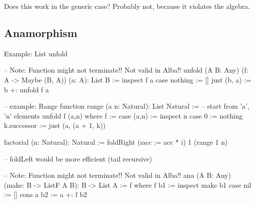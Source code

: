 Does this work in the generic case? Probably not, because it violates the
algebra.





\subsection{Anamorphism}

Example: List unfold

\begin{alba}
    -- Note: Function might not terminate!! Not valid in Alba!!
    unfold (A B: Any) (f: A -> Maybe (B, A)) (a: A): List B :=
        inspect f a case
            nothing :=
                []
            just (b, a) :=
                b +: unfold f a

    -- example: Range function
    range (a n: Natural): List Natural :=
            -- start from 'a', 'n' elements
        unfold f (a,n)
        where
            f :=
                case
                    (a,n) :=
                        inspect n case
                            0 :=
                                nothing
                            k.successor :=
                                just (a, (a + 1, k))
\end{alba}





\begin{alba}
    factorial (n: Natural): Natural :=
        foldRight (\i acc := acc * i) 1 (range 1 n)

        -- foldLeft would be more efficient (tail recursive)
\end{alba}


\begin{alba}
    -- Note: Function might not terminate!! Not valid in Alba!!
    ana (A B: Any) (make: B -> ListF A B): B -> List A :=
        f where
            f b1 :=
                inspect make b1 case
                    nil :=
                        []
                    cons a b2 :=
                        a +: f b2
\end{alba}







\begin{alba}
\end{alba}








